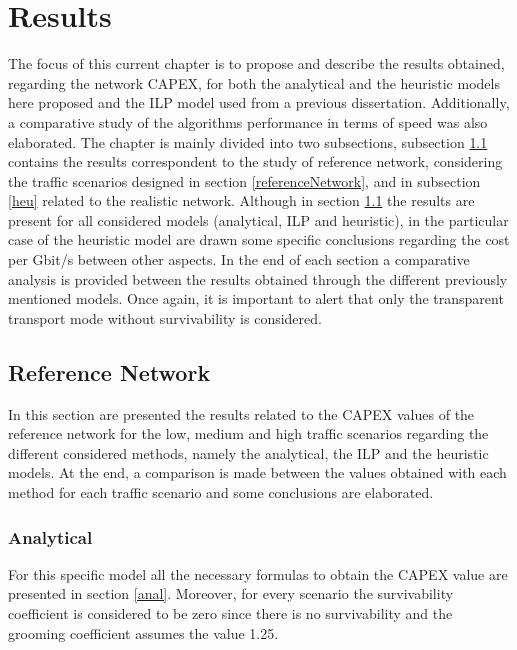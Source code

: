 \chapter{Results}
\label{chapter6}

The focus of this current chapter is to propose and describe the results obtained, regarding the network CAPEX, for both the analytical and the heuristic models here proposed and the ILP model used from a previous dissertation. Additionally, a comparative study of the algorithms performance in terms of speed was also elaborated. The chapter is mainly divided into two subsections, subsection \ref{ref} contains the results correspondent to the study of reference network, considering the traffic scenarios designed in section \ref{referenceNetwork}, and in subsection \ref{heu} related to the realistic network. Although in section \ref{ref} the results are present for all considered models (analytical, ILP and heuristic), in the particular case of the heuristic model are drawn some specific conclusions regarding the cost per Gbit/s between other aspects. In the end of each section a comparative analysis is provided between the results obtained through the different previously mentioned models. Once again, it is important to alert that only the transparent transport mode without survivability is considered.



\section{Reference Network}
\label{ref}
\vspace{11pt}
In this section are presented the results related to the CAPEX values of the reference network for the low, medium and high traffic scenarios regarding the different considered methods, namely the analytical, the ILP and the heuristic models. At the end, a comparison is made between the values obtained with each method for each traffic scenario and some conclusions are elaborated.

\subsection{Analytical}
\vspace{11pt}
For this specific model all the necessary formulas to obtain the CAPEX value are presented in section \ref{anal}. Moreover, for every scenario the survivability coefficient is considered to be zero since there is no survivability and the grooming coefficient assumes the value 1.25.

